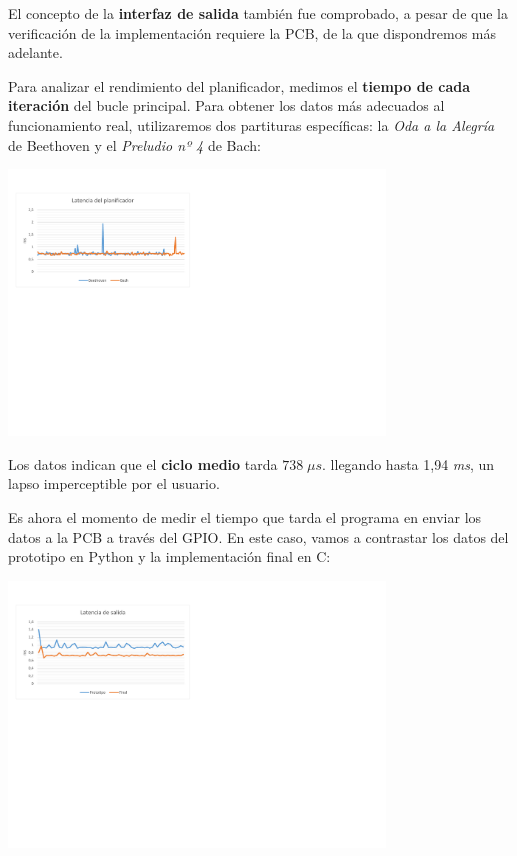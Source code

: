 \documentclass[10pt,a4paper]{article}
\begin{document}
	El concepto de la \textbf{interfaz de salida} también fue comprobado, a pesar de que la verificación de la implementación requiere la PCB, de la que dispondremos más adelante.
	
	Para analizar el rendimiento del planificador, medimos el \textbf{tiempo de cada iteración} del bucle principal. Para obtener los datos más adecuados al funcionamiento real, utilizaremos dos partituras específicas: la \textit{Oda a la Alegría} de Beethoven y el \textit{Preludio nº 4} de Bach:
	
	\begin{center}
		\includegraphics[width=0.75\textwidth]{images/lat_sched} 
	\end{center}
	
	Los datos indican que el \textbf{ciclo medio} tarda $738 \; \mu s$. llegando hasta 1,94 \textit{ms}, un lapso imperceptible por el usuario.
	
	Es ahora el momento de medir el tiempo que tarda el programa en enviar los datos a la PCB a través del GPIO. En este caso, vamos a contrastar los datos del prototipo en Python y la implementación final en C:
	
	\begin{center}
		\includegraphics[width=0.75\textwidth]{images/lat_gpio} 
	\end{center}
	
\end{document}
